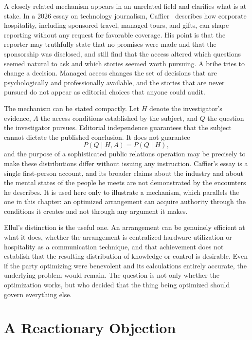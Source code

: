 A closely related mechanism appears in an unrelated field and clarifies what is at stake. In a 2026 essay on technology journalism, Caffier~\cite{caffier2026} describes how corporate hospitality, including sponsored travel, managed tours, and gifts, can shape reporting without any request for favorable coverage. His point is that the reporter may truthfully state that no promises were made and that the sponsorship was disclosed, and still find that the access altered which questions seemed natural to ask and which stories seemed worth pursuing. A bribe tries to change a decision. Managed access changes the set of decisions that are psychologically and professionally available, and the stories that are never pursued do not appear as editorial choices that anyone could audit.

The mechanism can be stated compactly. Let $H$ denote the investigator's evidence, $A$ the access conditions established by the subject, and $Q$ the question the investigator pursues. Editorial independence guarantees that the subject cannot dictate the published conclusion. It does not guarantee
\[
P(Q\mid H,A)=P(Q\mid H),
\]
and the purpose of a sophisticated public relations operation may be precisely to make these distributions differ without issuing any instruction. Caffier's essay is a single first-person account, and its broader claims about the industry and about the mental states of the people he meets are not demonstrated by the encounters he describes. It is used here only to illustrate a mechanism, which parallels the one in this chapter: an optimized arrangement can acquire authority through the conditions it creates and not through any argument it makes.

Ellul's distinction is the useful one. An arrangement can be genuinely efficient at what it does, whether the arrangement is centralized hardware utilization or hospitality as a communication technique, and that achievement does not establish that the resulting distribution of knowledge or control is desirable. Even if the party optimizing were benevolent and its calculations entirely accurate, the underlying problem would remain. The question is not only whether the optimization works, but who decided that the thing being optimized should govern everything else.

\section{A Reactionary Objection}

